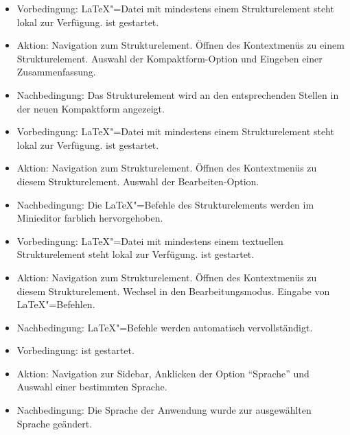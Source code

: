 \begin{itemize}
\item Vorbedingung: \LaTeX"=Datei mit mindestens einem Strukturelement steht lokal zur Verfügung.
  \texla{} ist gestartet.
  \item Aktion: Navigation zum Strukturelement.
  Öffnen des Kontextmenüs zu einem Strukturelement.
  Auswahl der Kompaktform-Option und Eingeben einer Zusammenfassung.
  \item Nachbedingung: Das Strukturelement wird an den entsprechenden Stellen in der neuen Kompaktform angezeigt.

\end{itemize}
\clearpage


\begin{itemize}
\item Vorbedingung: \LaTeX"=Datei mit mindestens einem Strukturelement steht lokal zur Verfügung.
  \texla{} ist gestartet.
  \item Aktion: Navigation zum Strukturelement.
  Öffnen des Kontextmenüs zu diesem Strukturelement.
  Auswahl der Bearbeiten-Option.
  \item Nachbedingung: Die \LaTeX"=Befehle des Strukturelements werden im Minieditor farblich hervorgehoben.

\end{itemize}

\begin{itemize}
\item Vorbedingung: \LaTeX"=Datei mit mindestens einem textuellen Strukturelement steht lokal zur Verfügung.
  \texla{} ist gestartet.
  \item Aktion: Navigation zum Strukturelement.
  Öffnen des Kontextmenüs zu diesem Strukturelement.
  Wechsel in den Bearbeitungsmodus.
  Eingabe von \LaTeX"=Befehlen.
  \item Nachbedingung: \LaTeX"=Befehle werden automatisch vervollständigt.

\end{itemize}

\begin{itemize}
\item Vorbedingung: \texla{} ist gestartet.
  \item Aktion: Navigation zur Sidebar, Anklicken der Option \enquote{Sprache} und Auswahl einer bestimmten Sprache.
  \item Nachbedingung: Die Sprache der Anwendung wurde zur ausgewählten Sprache geändert.

\end{itemize}
\clearpage

